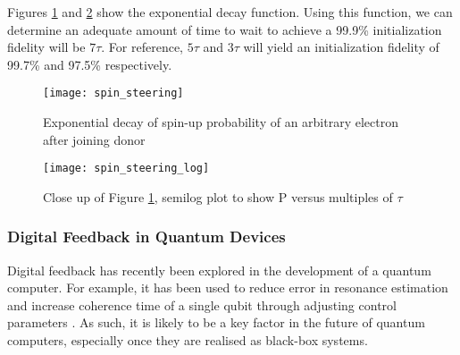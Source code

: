 Figures \ref{fig::spin_steering} and \ref{fig::spin_steering_log} show the exponential decay function. Using this function, we can determine an adequate amount of time to wait to achieve a 99.9\% initialization fidelity will be $7 \tau$. For reference, $5 \tau$ and $3 \tau$ will yield an initialization fidelity of 99.7\% and 97.5\% respectively.

\begin{figure}[htbp!]
	\centering
	\texttt{[image: spin\_steering]}
	\caption{Exponential decay of spin-up probability of an arbitrary electron after joining donor}
	\label{fig::spin_steering}
\end{figure}


\begin{figure}[htbp!]
	\centering
	\texttt{[image: spin\_steering\_log]}
	\caption{Close up of Figure \ref{fig::spin_steering}, semilog plot to show P versus multiples of $\tau$}
	\label{fig::spin_steering_log}
\end{figure}
\subsubsection{Digital Feedback in Quantum Devices}

Digital feedback has recently been explored in the development of a quantum computer. For example, it has been used to reduce error in resonance estimation \cite{bonato2015optimized} and increase coherence time of a single qubit through adjusting control parameters \cite{shulman2014suppressing}. As such, it is likely to be a key factor in the future of quantum computers, especially once they are realised as black-box systems.
